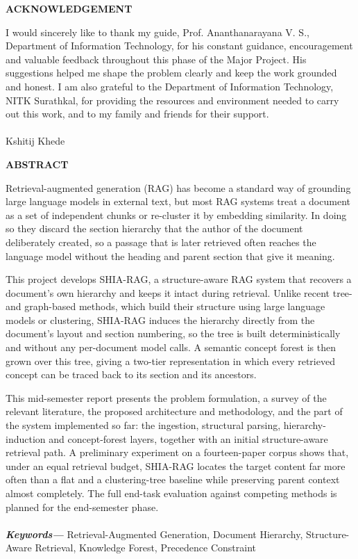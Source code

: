 \documentclass[12pt, a4paper, openright, twoside]{report}
\providecommand{\keywords}[1]{\textbf{\textit{Keywords---}} #1}
\begin{document}
\begin{center}
\textbf{{\Large ACKNOWLEDGEMENT}}\\
\end{center}
\null
I would sincerely like to thank my guide, Prof. Ananthanarayana V. S., Department of Information Technology, for his constant guidance, encouragement and valuable feedback throughout this phase of the Major Project. His suggestions helped me shape the problem clearly and keep the work grounded and honest. I am also grateful to the Department of Information Technology, NITK Surathkal, for providing the resources and environment needed to carry out this work, and to my family and friends for their support.
\\
\\
\null \hfill Kshitij Khede
\\
\clearpage
\cleardoublepage

\begin{center}
\textbf{{\Large ABSTRACT}}\\
\end{center}
Retrieval-augmented generation (RAG) has become a standard way of grounding large language models in external text, but most RAG systems treat a document as a set of independent chunks or re-cluster it by embedding similarity. In doing so they discard the section hierarchy that the author of the document deliberately created, so a passage that is later retrieved often reaches the language model without the heading and parent section that give it meaning.

This project develops SHIA-RAG, a structure-aware RAG system that recovers a document's own hierarchy and keeps it intact during retrieval. Unlike recent tree- and graph-based methods, which build their structure using large language models or clustering, SHIA-RAG induces the hierarchy directly from the document's layout and section numbering, so the tree is built deterministically and without any per-document model calls. A semantic concept forest is then grown over this tree, giving a two-tier representation in which every retrieved concept can be traced back to its section and its ancestors.

This mid-semester report presents the problem formulation, a survey of the relevant literature, the proposed architecture and methodology, and the part of the system implemented so far: the ingestion, structural parsing, hierarchy-induction and concept-forest layers, together with an initial structure-aware retrieval path. A preliminary experiment on a fourteen-paper corpus shows that, under an equal retrieval budget, SHIA-RAG locates the target content far more often than a flat and a clustering-tree baseline while preserving parent context almost completely. The full end-task evaluation against competing methods is planned for the end-semester phase.
\hspace{1cm}
\null
\\
\\
\keywords{Retrieval-Augmented Generation, Document Hierarchy, Structure-Aware Retrieval, Knowledge Forest, Precedence Constraint}
\end{document}
